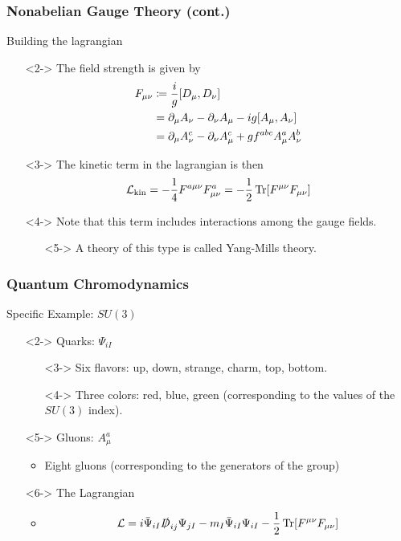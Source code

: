 \documentclass{beamer}
\begin{document}
\begin{frame}
    \frametitle{Nonabelian Gauge Theory (cont.)}
    \alert{Building the lagrangian}
    \begin{itemize}
        \item[\textbullet]<2-> The field strength is given by
        \begin{align*}
            F_{\mu\nu} &\coloneqq \frac{i}{g}\comm{D_\mu}{D_\nu} \\
            &= \partial_\mu A_\nu - \partial_\nu A_\mu - ig\comm{A_\mu}{A_\nu} \\
            &= \partial_\mu A_\nu^c - \partial_\nu A_\mu^c + gf^{abc}A_\mu^a A_\nu^b
        \end{align*}
        \item[\textbullet]<3-> The kinetic term in the lagrangian is then \[ \mathcal{L}_{\text{kin}} = -\frac{1}{4}F^{a\mu\nu}F_{\mu\nu}^a = -\frac{1}{2}\Tr[F^{\mu\nu}F_{\mu\nu}] \]
        \item[\textbullet]<4-> Note that this term includes interactions among the gauge fields.
        \begin{itemize}
            \item[\textbullet]<5-> A theory of this type is called Yang-Mills theory.
        \end{itemize}
    \end{itemize}
\end{frame}

\begin{frame}
    \frametitle{Quantum Chromodynamics}
    \alert{Specific Example: $SU(3)$}
    \begin{itemize}
        \item[\textbullet]<2-> Quarks: $\Psi_{iI}$
        \begin{itemize}
            \item[\textbullet]<3-> Six flavors: up, down, strange, charm, top, bottom.
            \item[\textbullet]<4-> Three colors: red, blue, green (corresponding to the values of the $SU(3)$ index).
        \end{itemize}
        \item[\textbullet]<5-> Gluons: $A_\mu^a$
        \begin{itemize}
            \item Eight gluons (corresponding to the generators of the group)
        \end{itemize}
        \item[\textbullet]<6-> The Lagrangian
        \begin{itemize}
            \item<7-> \[ \mathcal{L} = i\bar{\Psi}_{iI}\slashed{D}_{ij}\Psi_{jI} - m_I\bar{\Psi}_{iI}\Psi_{iI} - \frac{1}{2}\Tr[F^{\mu\nu}F_{\mu\nu}] \]
        \end{itemize}
    \end{itemize}
\end{frame}
\end{document}
